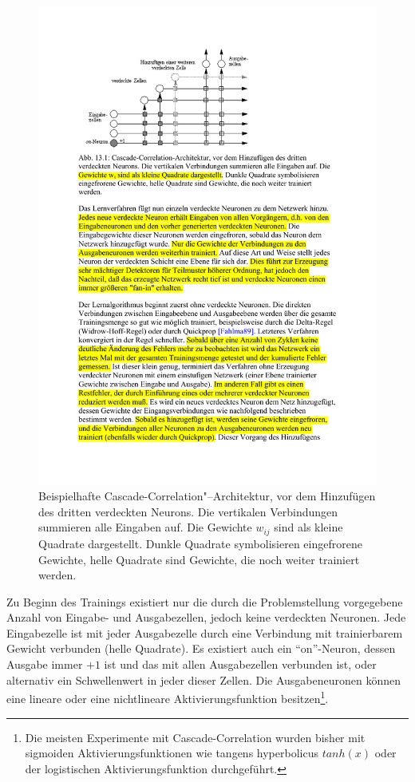 \begin{figure}[ht!] \centering 
	\includegraphics[width=\linewidth]{figures/ch06_cascade-correlation.pdf}
	\caption{Beispielhafte Cascade-Correlation"--Architektur, vor dem Hinzufügen des dritten verdeckten Neurons. Die vertikalen Verbindungen summieren alle Eingaben auf. Die Gewichte $w_{ij}$ sind als kleine Quadrate dargestellt. Dunkle Quadrate symbolisieren eingefrorene Gewichte, helle Quadrate sind Gewichte, die noch weiter trainiert werden.}
	\label{fig:ch06_cascade-correlation}
\end{figure}

Zu Beginn des Trainings existiert nur die durch die Problemstellung vorgegebene Anzahl von Eingabe- und Ausgabezellen, jedoch keine verdeckten Neuronen. Jede Eingabezelle ist mit jeder Ausgabezelle durch eine Verbindung mit trainierbarem Gewicht verbunden (helle Quadrate). Es existiert auch ein "`on"'-Neuron, dessen Ausgabe immer $+1$ ist und das mit allen Ausgabezellen verbunden ist, oder alternativ ein Schwellenwert in jeder dieser Zellen.
Die Ausgabeneuronen können eine lineare oder eine nichtlineare Aktivierungsfunktion besitzen\footnote{Die meisten Experimente mit Cascade-Correlation wurden bisher mit sigmoiden Aktivierungsfunktionen wie tangens hyperbolicus $tanh(x)$ oder der logistischen Aktivierungsfunktion durchgeführt.}.


